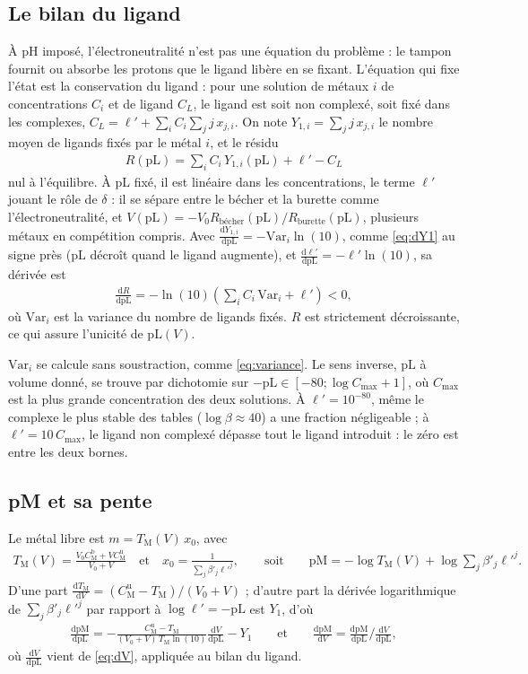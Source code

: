 \documentclass[a4paper,11pt]{article}
\newcommand\rsltm[1]{\boxed{#1}}
\newcommand\pH{\ensuremath{\mathrm{pH}}\xspace}
\newcommand\pL{\ensuremath{\mathrm{pL}}\xspace}
\newcommand\pM{\ensuremath{\mathrm{pM}}\xspace}
\newcommand\ddp[2]{\frac{\mathrm{d}#1}{\mathrm{d}#2}}
\newcommand\pare[1]{\left(#1\right)}
\newcommand\et{\quad\text{et}\quad}
\newcommand\Rb{R_\text{bécher}}
\newcommand\Ru{R_\text{burette}}
\begin{document}
\subsection{Le bilan du ligand}
À \pH imposé, l'électroneutralité n'est pas une équation du problème : le tampon fournit ou absorbe les protons que le ligand libère en se fixant.
L'équation qui fixe l'état est la conservation du ligand : pour une solution de métaux $i$ de concentrations $C_i$ et de ligand $C_L$, le ligand est soit non complexé, soit fixé dans les complexes, $C_L=\ell'+\sum_iC_i\sum_jj\,x_{j,i}$.
On note $Y_{1,i}=\sum_jj\,x_{j,i}$ le nombre moyen de ligands fixés par le métal $i$, et le résidu
\begin{align}
\rsltm{R(\pL)=\sum_iC_i\,Y_{1,i}(\pL)+\ell'-C_L}
\end{align}
nul à l'équilibre.
À \pL fixé, il est linéaire dans les concentrations, le terme $\ell'$ jouant le rôle de $\delta$ : il se sépare entre le bécher et la burette comme l'électroneutralité, et $V(\pL)=-V_0\Rb(\pL)/\Ru(\pL)$, plusieurs métaux en compétition compris.
Avec $\ddp{Y_{1,i}}\pL=-\mathrm{Var}_i\ln(10)$, comme \eqref{eq:dY1} au signe près (\pL décroît quand le ligand augmente), et $\ddp{\ell'}\pL=-\ell'\ln(10)$, sa dérivée est
\begin{align}
\ddp R\pL=-\ln(10)\pare{\sum_iC_i\,\mathrm{Var}_i+\ell'}<0,
\end{align}
où $\mathrm{Var}_i$ est la variance du nombre de ligands fixés.
$R$ est strictement décroissante, ce qui assure l'unicité de $\pL(V)$.
\begin{algo}
$\mathrm{Var}_i$ se calcule sans soustraction, comme \eqref{eq:variance}.
Le sens inverse, \pL à volume donné, se trouve par dichotomie sur $-\pL\in[-80;\log C_\text{max}+1]$, où $C_\text{max}$ est la plus grande concentration des deux solutions.
À $\ell'=10^{-80}$, même le complexe le plus stable des tables ($\log\beta\approx40$) a une fraction négligeable ; à $\ell'=10\,C_\text{max}$, le ligand non complexé dépasse tout le ligand introduit : le zéro est entre les deux bornes.
\end{algo}

\subsection{pM et sa pente}
Le métal libre est $m=T_\mathrm M(V)\,x_0$, avec
\begin{align}
T_\mathrm M(V)=\frac{V_0C_\mathrm M^\text{b}+VC_\mathrm M^\text{u}}{V_0+V}
\et
x_0=\frac1{\sum_j\beta'_j\ell'^j},
\qquad\text{soit}\qquad
\pM=-\log T_\mathrm M(V)+\log\sum_j\beta'_j\ell'^j.
\end{align}
D'une part $\ddp{T_\mathrm M}V=\pare{C^\text{u}_\mathrm M-T_\mathrm M}/(V_0+V)$ ; d'autre part la dérivée logarithmique de $\sum_j\beta'_j\ell'^j$ par rapport à $\log\ell'=-\pL$ est $Y_1$, d'où
\begin{align}
\rsltm{\ddp\pM\pL=-\frac{C^\text{u}_\mathrm M-T_\mathrm M}{(V_0+V)\,T_\mathrm M\ln(10)}\ddp V\pL-Y_1}
\qquad\text{et}\qquad
\ddp\pM V=\ddp\pM\pL\Big/\ddp V\pL,
\end{align}
où $\ddp V\pL$ vient de \eqref{eq:dV}, appliquée au bilan du ligand.
\end{document}
